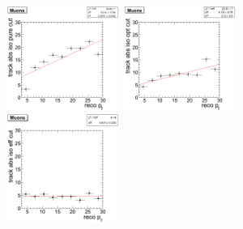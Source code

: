 \begin{figure}[htbp]
   \includegraphics[width = 0.33\textwidth]{pictures/optIsoCut/trackIso_muon_pure.png}
   \includegraphics[width = 0.33\textwidth]{pictures/optIsoCut/trackIso_muon_opt.png}
   \includegraphics[width = 0.33\textwidth]{pictures/optIsoCut/trackIso_muon_eff.png}
   \label{fig:optTrackIso_muon}
\end{figure}


